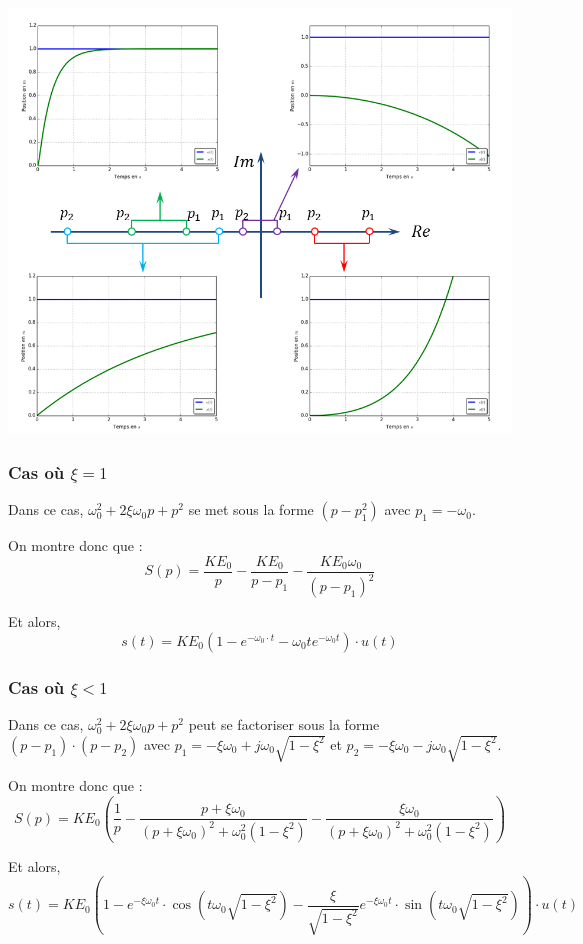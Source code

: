 \documentclass[10pt,oneside]{article}
\begin{document}
\begin{center}
 \includegraphics[width=.8\textwidth]{png/poles_1}
\end{center}

\subsubsection{Cas où $\xi=1$}
Dans ce cas, $\omega_0^2+2\xi\omega_0 p+ p^2$ se met sous la forme $\left( p-p_1^2\right) $ avec $p_1 = -\omega_0$.

On montre donc que :
$$
S(p)= \dfrac{KE_0}{p} - \dfrac{KE_0}{p-p_1} - \dfrac{KE_0 \omega_0}{\left(p-p_1\right)^2}
$$

Et alors, 
$$
s(t) = KE_0\left(1- e^{-\omega_0 \cdot t} -\omega_0 t  e^{-\omega_0t} \right) \cdot u(t)
$$

\subsubsection{Cas où $\xi<1$}
Dans ce cas, $\omega_0^2+2\xi\omega_0 p+p^2$ peut se factoriser sous la forme $\left(p-p_1\right)\cdot\left(p-p_2\right)$ avec $p_1 = -\xi\omega_0 + j \omega_0 \sqrt{1-\xi^2}$ et $p_2 = -\xi\omega_0 - j \omega_0 \sqrt{1-\xi^2}$.

On montre donc que :
$$
S(p)= KE_0\left( 
\dfrac{1}{p}
-\dfrac{p+\xi\omega_0}{\left( p+\xi\omega_0\right)^2+\omega_0^2\left(1-\xi^2\right)}
-\dfrac{\xi\omega_0}{\left( p+\xi\omega_0\right)^2+\omega_0^2\left(1-\xi^2\right)}
\right)
$$

Et alors, 
$$
s(t) = KE_0\left(1
- e^{-\xi\omega_0 t}\cdot\cos \left(t\omega_0 \sqrt{1-\xi^2} \right)
- \dfrac{\xi}{\sqrt{1-\xi^2}} e^{-\xi\omega_0 t}\cdot\sin \left(t\omega_0 \sqrt{1-\xi^2} \right)
\right) \cdot u(t)
$$
\end{document}

